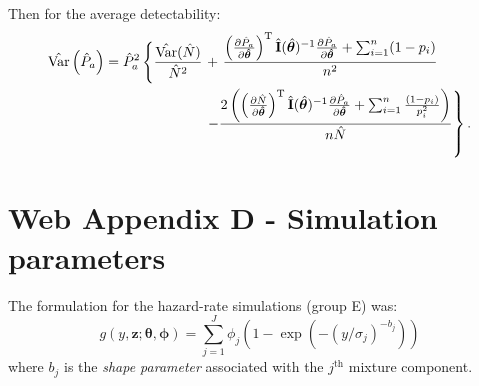 \documentclass{report}
\begin{document}
Then for the average detectability:
\begin{align*}
\hat{\text{Var}}\left( \hat{P}_a \right) = \hat{P}_a^2\left\{ \vphantom{\frac{\frac{a}{b}^b}{b}} \frac{\hat{\text{Var}}(\hat{N})}{\hat{N}^2}\right. &+\left.\frac{\left(\frac{\partial \hat{P}_a}{\partial\bm{\hat{\theta}}}\right)^\text{T}\hat{\mathbf{I}}(\hat{\bm{\theta}})^{-1}\frac{\partial \hat{P}_a}{\partial\bm{\hat{\theta}}}+\sum_{i=1}^n (1-p_i)}{n^2} \right. \\
 & \left. - \frac{2\left(\left(\frac{\partial \hat{N}}{\partial\bm{\hat{\theta}}}\right)^\text{T}\hat{\mathbf{I}}(\hat{\bm{\theta}})^{-1}\frac{\partial \hat{P}_a}{\partial\bm{\hat{\theta}}}+\sum_{i=1}^n\frac{(1-p_i)}{p_i^2}\right)}{n\hat{N}}\right\}.\\
\end{align*}

\section*{Web Appendix D - Simulation parameters}

The formulation for the hazard-rate simulations (group E) was:
\begin{equation*}
g(y,\mathbf{z}; \bm{\theta}, \bm{\phi}) = \sum_{j=1}^J \phi_j (1-\exp(-(y/\sigma_j)^{-b_j}))
\end{equation*}
where $b_j$ is the \textit{shape parameter} associated with the $j^\text{th}$ mixture component.
\end{document}
